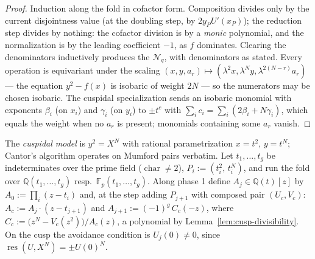 \begin{proof}
\leanok
Induction along the fold in cofactor form. Composition divides only by the current
disjointness value (at the doubling step, by $2 y_{P} U'(x_P)$); the reduction step
divides by nothing: the cofactor division is by a \emph{monic} polynomial, and the
normalization is by the leading coefficient $-1$, as $f$ dominates. Clearing the
denominators inductively produces the $\mathcal{N}_q$, with denominators as stated.
Every operation is equivariant under the scaling
$(x, y, a_r) \mapsto (\lambda^2 x, \lambda^N y, \lambda^{2(N-r)} a_r)$ --- the equation
$y^2 - f(x)$ is isobaric of weight $2N$ --- so the numerators may be chosen isobaric.
The cuspidal specialization sends an isobaric monomial with exponents $\beta_i$ (on
$x_i$) and $\gamma_i$ (on $y_i$) to $\pm t^{c}$ with
$\sum_i c_i = \sum_i (2\beta_i + N\gamma_i)$, which equals the weight when no $a_r$ is
present; monomials containing some $a_r$ vanish.
\end{proof}

\begin{definition}
\label{def:cusp-fold}
\leanok
The \emph{cuspidal model} is $y^2 = X^N$ with rational parametrization $x = t^2$,
$y = t^N$; Cantor's algorithm operates on Mumford pairs verbatim. Let $t_1, \dots, t_g$
be indeterminates over the prime field ($\operatorname{char} \neq 2$),
$P_i := (t_i^2,\, t_i^N)$, and run the fold over $\mathbb{Q}(t_1, \dots, t_g)$ resp.\
$\mathbb{F}_p(t_1, \dots, t_g)$. Along phase 1 define $A_j \in \mathbb{Q}(t)[z]$ by
$A_0 := \prod_i (z - t_i)$ and, at the step adding $P_{j+1}$ with composed pair
$(U_c, V_c)$: $A_c := A_j \cdot (z - t_{j+1})$ and $A_{j+1} := (-1)^g\, C_c(-z)$, where
$C_c := \bigl(z^N - V_c(z^2)\bigr)/A_c(z)$, a polynomial by
Lemma~\ref{lem:cusp-divisibility}. On the cusp the avoidance condition is
$U_j(0) \neq 0$, since $\operatorname{res}(U, X^N) = \pm U(0)^N$.
\end{definition}

